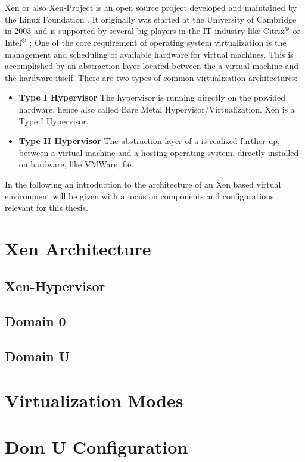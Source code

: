 \\~\\
Xen or also Xen-Project is an open source project developed and maintained by the Linux Foundation
. It originally was started at the University of Cambridge in 2003 and is supported by several 
big players in the IT-industry like Citrix$^\text{\textregistered}$ or Intel$^\text{\textregistered}$ \cite{xenprjct}; One of the core requirement of operating system virtualization is the management and scheduling of available hardware for virtual machines. This is accomplished by an abstraction layer located between the a virtual machine and the hardware itself. There are two types of common virtualization architectures:

\begin{itemize}
	\item \textbf{Type I Hypervisor} The hypervisor is running directly on the provided hardware, hence also called Bare Metal Hypervisor/Virtualization. Xen is a Type I Hypervisor. 
	\item \textbf{Type II Hypervisor} The abstraction layer of a is realized further up, between a virtual machine and a hosting operating system, directly installed on hardware, like VMWare, f.e. 
\end{itemize}

In the following an introduction to the architecture of an Xen based virtual environment will be given with a focus on components and configurations relevant for this thesis. 


\section{Xen Architecture}
\subsection{Xen-Hypervisor}
\subsection{Domain 0}
\subsection{Domain U}

\section{Virtualization Modes}

\section{Dom U Configuration}



